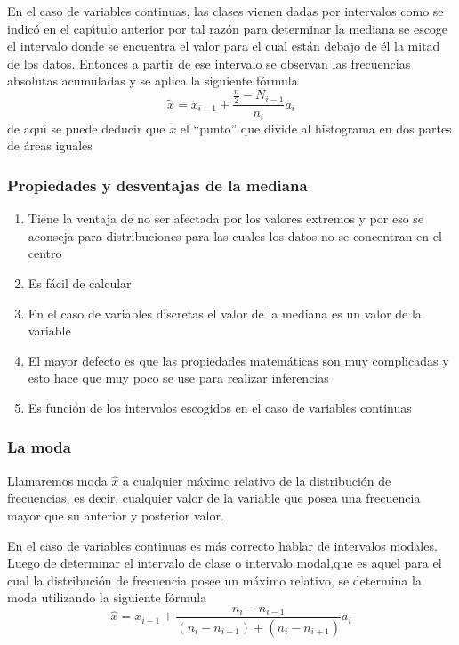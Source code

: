 En el caso de variables continuas, las clases vienen dadas por intervalos como
se indic\'{o} en el cap\'{\i}tulo anterior por tal raz\'{o}n para determinar
la mediana se escoge el intervalo donde se encuentra el valor para el cual
est\'{a}n debajo de \'{e}l la mitad de los datos. Entonces a partir de ese
intervalo se observan las frecuencias absolutas acumuladas y se aplica la
siguiente f\'{o}rmula
\[
\widetilde{x}=x_{i-1}+\frac{\frac{n}{2}-N_{i-1}}{n_{i}}a_{i}%
\]
de aqu\'{\i} se puede deducir que $\widetilde{x}$ el ``punto'' que divide al
histograma en dos partes de \'{a}reas iguales

\subsubsection{Propiedades y desventajas de la mediana}

\begin{enumerate}
\item Tiene la ventaja de no ser afectada por los valores extremos y por eso
se aconseja para distribuciones para las cuales los datos no se concentran en
el centro

\item Es f\'{a}cil de calcular

\item En el caso de variables discretas el valor de la mediana es un valor de
la variable

\item El mayor defecto es que las propiedades matem\'{a}ticas son muy
complicadas y esto hace que muy poco se use para realizar inferencias

\item Es funci\'{o}n de los intervalos escogidos en el caso de variables continuas
\end{enumerate}

\subsubsection{La moda}

Llamaremos moda $\widehat{x}$ a cualquier m\'{a}ximo relativo de la
distribuci\'{o}n de frecuencias, es decir, cualquier valor de la variable que
posea una frecuencia mayor que su anterior y posterior valor.

En el caso de variables continuas es m\'{a}s correcto hablar de intervalos
modales. Luego de determinar el intervalo de clase o intervalo modal,que es
aquel para el cual la distribuci\'{o}n de frecuencia posee un m\'{a}ximo
relativo, se determina la moda utilizando la siguiente f\'{o}rmula
\[
\widehat{x}=x_{i-1}+\frac{n_{i}-n_{i-1}}{\left(  n_{i}-n_{i-1}\right)
+\left(  n_{i}-n_{i+1}\right)  }a_{i}%
\]

